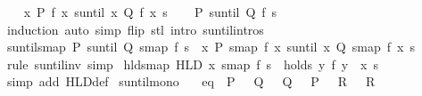 \begin{isabellebody}
\isamarkupfalse%
\isanewline
\ \ \isamarkupfalse%
\ {\isachardoublequoteopen}{\isacharparenleft}{\isacharparenleft}{\isasymlambda}x{\isachardot}\ P\ {\isacharparenleft}f\ x{\isacharparenright}{\isacharparenright}\ suntil\ {\isacharparenleft}{\isasymlambda}x{\isachardot}\ Q\ {\isacharparenleft}f\ x{\isacharparenright}{\isacharparenright}{\isacharparenright}\ s{\isachardoublequoteclose}\ \isamarkupfalse%
\ \isamarkupfalse%
\ {\isachardoublequoteopen}{\isacharparenleft}P\ suntil\ Q{\isacharparenright}\ {\isacharparenleft}f\ s{\isacharparenright}{\isachardoublequoteclose}\isanewline
\ \ \ \ \isamarkupfalse%
\ induction\ {\isacharparenleft}auto\ simp\ flip{\isacharcolon}\ stl\ intro{\isacharcolon}\ suntil{\isachardot}intros{\isacharparenright}\isanewline
{}\isamarkupfalse%
%
\endisatagproof
{\isafoldproof}%
%
\isadelimproof
\isanewline
%
\endisadelimproof
\isanewline
{}\isamarkupfalse%
\ suntil{\isacharunderscore}smap{\isacharcolon}\ {\isachardoublequoteopen}{\isacharparenleft}P\ suntil\ Q{\isacharparenright}\ {\isacharparenleft}smap\ f\ s{\isacharparenright}\ {\isasymlongleftrightarrow}\ {\isacharparenleft}{\isacharparenleft}{\isasymlambda}x{\isachardot}\ P\ {\isacharparenleft}smap\ f\ x{\isacharparenright}{\isacharparenright}\ suntil\ {\isacharparenleft}{\isasymlambda}x{\isachardot}\ Q\ {\isacharparenleft}smap\ f\ x{\isacharparenright}{\isacharparenright}{\isacharparenright}\ s{\isachardoublequoteclose}\isanewline
%
\isadelimproof
\ \ %
\endisadelimproof
%
\isatagproof
{}\isamarkupfalse%
\ {\isacharparenleft}rule\ suntil{\isacharunderscore}inv{\isacharparenright}\ simp%
\endisatagproof
{\isafoldproof}%
%
\isadelimproof
\isanewline
%
\endisadelimproof
\isanewline
{}\isamarkupfalse%
\ hld{\isacharunderscore}smap{\isacharcolon}\ {\isachardoublequoteopen}HLD\ x\ {\isacharparenleft}smap\ f\ s{\isacharparenright}\ {\isacharequal}\ holds\ {\isacharparenleft}{\isasymlambda}y{\isachardot}\ f\ y\ {\isasymin}\ x{\isacharparenright}\ s{\isachardoublequoteclose}\isanewline
%
\isadelimproof
\ \ %
\endisadelimproof
%
\isatagproof
{}\isamarkupfalse%
\ {\isacharparenleft}simp\ add{\isacharcolon}\ HLD{\isacharunderscore}def{\isacharparenright}%
\endisatagproof
{\isafoldproof}%
%
\isadelimproof
\isanewline
%
\endisadelimproof
\isanewline
{}\isamarkupfalse%
\ suntil{\isacharunderscore}mono{\isacharcolon}\isanewline
\ \ \ eq{\isacharcolon}\ {\isachardoublequoteopen}{\isasymAnd}{\isasymomega}{\isachardot}\ P\ {\isasymomega}\ {\isasymLongrightarrow}\ Q{}\ {\isasymomega}\ {\isasymLongrightarrow}\ Q{}\ {\isasymomega}{\isachardoublequoteclose}\ {\isachardoublequoteopen}{\isasymAnd}{\isasymomega}{\isachardot}\ P\ {\isasymomega}\ {\isasymLongrightarrow}\ R{}\ {\isasymomega}\ {\isasymLongrightarrow}\ R{}\ {\isasymomega}{\isachardoublequoteclose}\isanewline

\end{isabellebody}
